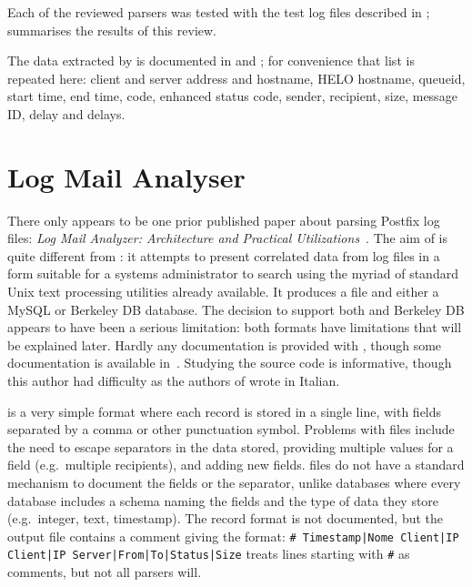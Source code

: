 Each of the reviewed parsers was tested with the \numberOFlogFILES{} test
log files described in ;  summarises the results of this review.

The data extracted by \parsername{} is documented in
 and ; for
convenience that list is repeated here: client and server 
address and hostname, HELO hostname, queueid, start time, end time,
 code, enhanced status code, sender, recipient, size, message
ID, delay and delays.

\section{Log Mail Analyser}

\label{prior art}

There only appears to be one prior published paper about parsing Postfix
log files: \textit{Log Mail Analyzer: Architecture and Practical
Utilizations\/}~\cite{log-mail-analyser}.  The aim of  is
quite different from \parsername{}: it attempts to present correlated data
from log files in a form suitable for a systems administrator to search
using the myriad of standard Unix text processing utilities already
available.  It produces a  file and either a MySQL or Berkeley
DB database.  The decision to support both  and Berkeley DB
appears to have been a serious limitation: both formats have limitations
that will be explained later.  Hardly any documentation is provided with
, though some documentation is available
in~\cite{log-mail-analyser}.  Studying the source code is informative,
though this author had difficulty as the authors of  wrote in
Italian.

 is a very simple format where each record is stored in a
single line, with fields separated by a comma or other punctuation symbol.
Problems with  files include the need to escape separators in
the data stored, providing multiple values for a field (e.g.\ multiple
recipients), and adding new fields.   files do not have a
standard mechanism to document the fields or the separator, unlike
 databases where every database includes a schema naming the
fields and the type of data they store (e.g.\ integer, text, timestamp).
The  record format is not documented, but the output file
contains a comment giving the format:\newline{} \texttt{\# Timestamp|Nome
Client|IP Client|IP Server|From|To|Status|Size} \newline{}
treats  lines starting with \texttt{\#} as comments, but not
all  parsers will.


